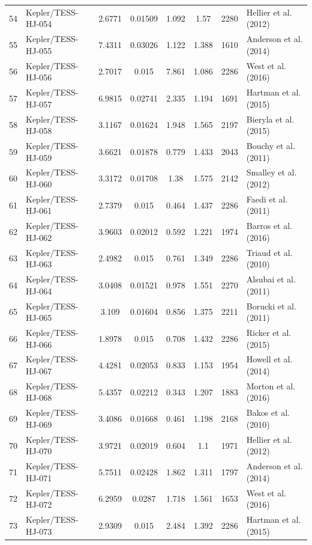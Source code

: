 \begin{longtable}{r l c c c c c p{4.2cm}}
54 & Kepler/TESS-HJ-054 & 2.6771 & 0.01509 & 1.092 & 1.57 & 2280 & Hellier et al. (2012) \\
55 & Kepler/TESS-HJ-055 & 7.4311 & 0.03026 & 1.122 & 1.388 & 1610 & Anderson et al. (2014) \\
56 & Kepler/TESS-HJ-056 & 2.7017 & 0.015 & 7.861 & 1.086 & 2286 & West et al. (2016) \\
57 & Kepler/TESS-HJ-057 & 6.9815 & 0.02741 & 2.335 & 1.194 & 1691 & Hartman et al. (2015) \\
58 & Kepler/TESS-HJ-058 & 3.1167 & 0.01624 & 1.948 & 1.565 & 2197 & Bieryla et al. (2015) \\
59 & Kepler/TESS-HJ-059 & 3.6621 & 0.01878 & 0.779 & 1.433 & 2043 & Bouchy et al. (2011) \\
60 & Kepler/TESS-HJ-060 & 3.3172 & 0.01708 & 1.38 & 1.575 & 2142 & Smalley et al. (2012) \\
61 & Kepler/TESS-HJ-061 & 2.7379 & 0.015 & 0.464 & 1.437 & 2286 & Faedi et al. (2011) \\
62 & Kepler/TESS-HJ-062 & 3.9603 & 0.02012 & 0.592 & 1.221 & 1974 & Barros et al. (2016) \\
63 & Kepler/TESS-HJ-063 & 2.4982 & 0.015 & 0.761 & 1.349 & 2286 & Triaud et al. (2010) \\
64 & Kepler/TESS-HJ-064 & 3.0408 & 0.01521 & 0.978 & 1.551 & 2270 & Alsubai et al. (2011) \\
65 & Kepler/TESS-HJ-065 & 3.109 & 0.01604 & 0.856 & 1.375 & 2211 & Borucki et al. (2011) \\
66 & Kepler/TESS-HJ-066 & 1.8978 & 0.015 & 0.708 & 1.432 & 2286 & Ricker et al. (2015) \\
67 & Kepler/TESS-HJ-067 & 4.4281 & 0.02053 & 0.833 & 1.153 & 1954 & Howell et al. (2014) \\
68 & Kepler/TESS-HJ-068 & 5.4357 & 0.02212 & 0.343 & 1.207 & 1883 & Morton et al. (2016) \\
69 & Kepler/TESS-HJ-069 & 3.4086 & 0.01668 & 0.461 & 1.198 & 2168 & Bakos et al. (2010) \\
70 & Kepler/TESS-HJ-070 & 3.9721 & 0.02019 & 0.604 & 1.1 & 1971 & Hellier et al. (2012) \\
71 & Kepler/TESS-HJ-071 & 5.7511 & 0.02428 & 1.862 & 1.311 & 1797 & Anderson et al. (2014) \\
72 & Kepler/TESS-HJ-072 & 6.2959 & 0.0287 & 1.718 & 1.561 & 1653 & West et al. (2016) \\
73 & Kepler/TESS-HJ-073 & 2.9309 & 0.015 & 2.484 & 1.392 & 2286 & Hartman et al. (2015) \\

\end{longtable}
